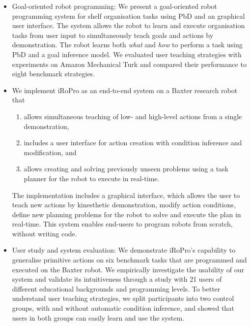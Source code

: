 \begin{itemize}
	\item {Goal-oriented robot programming: We present a goal-oriented robot programming system for shelf organisation tasks using PbD and an graphical user interface. %
		The system allows the robot to learn and execute organisation tasks from user input to simultaneously teach goals and actions by demonstration.
		The robot learns both \textit{what} and \textit{how} to perform a task using PbD and a goal inference model.
		We evaluated user teaching strategies with experiments on Amazon Mechanical Turk and compared their performance to eight benchmark strategies.\\
}

	\item {We implement iRoPro as an end-to-end system on a Baxter research robot that 
		\begin{enumerate}
			\item allows simultaneous teaching of low- and high-level actions from a single demonstration, 
			\item includes a user interface for action creation with condition inference and modification, and
			\item allows creating and solving previously unseen problems using a task planner for the robot to execute in real-time.
		\end{enumerate}
	The implementation includes a graphical interface, which allows the user to teach new actions by kinesthetic demonstration, modify action conditions, define new planning problems for the robot to solve and execute the plan in real-time.
	This system enables end-users to program robots from scratch, without writing code.%
}

	\item {User study and system evaluation:
	We demonstrate iRoPro's capability to generalise primitive actions on six benchmark tasks that are programmed and executed on the Baxter robot.
	We empirically investigate the usability of our system and validate its intuitiveness through a study with 21 users of different educational backgrounds and programming levels.
	To better understand user teaching strategies, we split participants into two control groups, with and without automatic condition inference, and showed that users in both groups can easily learn and use the system.}
	
	
\end{itemize}
